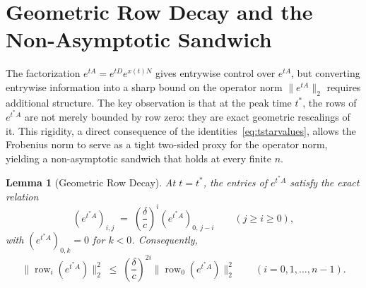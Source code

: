 \documentclass[11pt,reqno]{article}
\theoremstyle{plain}
\newtheorem{lemma}[theorem]{Lemma}
\theoremstyle{definition}
\theoremstyle{remark}
\numberwithin{equation}{section}
\begin{document}
\section{Geometric Row Decay and the Non-Asymptotic Sandwich}\label{sec:sandwich}

The factorization $e^{tA} = e^{tD}e^{x(t)N}$ gives entrywise control over $e^{tA}$, but converting entrywise information into a sharp bound on the operator norm $\|e^{tA}\|_2$ requires additional structure. The key observation is that at the peak time $t^*$, the rows of $e^{t^*A}$ are not merely bounded by row zero: they are exact geometric rescalings of it. This rigidity, a direct consequence of the identities~\eqref{eq:tstarvalues}, allows the Frobenius norm to serve as a tight two-sided proxy for the operator norm, yielding a non-asymptotic sandwich that holds at every finite $n$.

\begin{lemma}[Geometric Row Decay]\label{lem:rowdecay}
At $t = t^*$, the entries of $e^{t^*A}$ satisfy the exact relation
\begin{equation}\label{eq:rowdecay}
  \left(e^{t^*A}\right)_{i,j} \;=\; \left(\frac{\delta}{c}\right)^i \left(e^{t^*A}\right)_{0,\,j-i} \qquad (j \ge i \ge 0),
\end{equation}
with $\left(e^{t^*A}\right)_{0,k} = 0$ for $k < 0$. Consequently,
\begin{equation}\label{eq:rowdecaybound}
  \bigl\|\operatorname{row}_i\left(e^{t^*A}\right)\bigr\|_2^2 \;\le\; \left(\frac{\delta}{c}\right)^{2i} \bigl\|\operatorname{row}_0\left(e^{t^*A}\right)\bigr\|_2^2 \qquad (i = 0, 1, \dots, n-1).
\end{equation}
\end{lemma}
\end{document}
